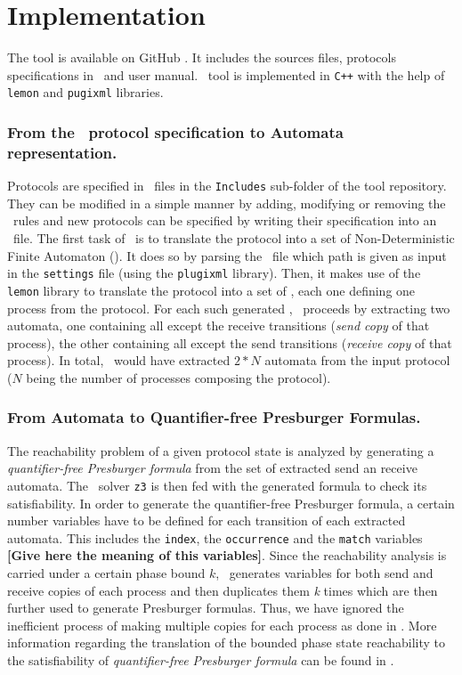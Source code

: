 \section{Implementation}
\label{sec:optim}

The tool is available on GitHub \cite{github.MPass}.
It includes the sources files, protocols specifications in \xml\ and user manual.
%
\MPass\ tool is implemented in \texttt{C++} with the help of \texttt{lemon} and \texttt{pugixml} libraries.
%

\subsubsection*{From the \Xml\ protocol specification to Automata representation.}
\label{subsec:copies}
Protocols are specified in \Xml\ files in the \texttt{Includes} sub-folder of the tool repository.
%
They can be modified in a simple manner by adding, modifying or removing the \Xml\ rules and
new protocols can be specified by writing their specification into an \Xml\ file.
%
The first task of \MPass\ is to translate the protocol into a set of Non-Deterministic Finite Automaton (\Nfa).
%
It does so by parsing the \Xml\ file which path is given as input in the \texttt{settings} file (using the \texttt{plugixml} library).
%
Then, it makes use of the \texttt{lemon} library to translate the protocol into a set of \Nfa,
each one defining one process from the protocol.
%
For each such generated \Nfa, \MPass\ proceeds by extracting two automata,
one containing all except the receive transitions (\textit{send copy} of that process),
the other containing all except the send transitions (\textit{receive copy} of that process).
%
In total, \MPass\ would have extracted $2*N$ automata from the input protocol
($N$ being the number of processes composing the protocol).

\subsubsection*{From Automata to Quantifier-free Presburger Formulas.}
The reachability problem of a given protocol state is analyzed by generating a \emph{quantifier-free Presburger formula}
from the set of extracted send an receive automata.
The \Smt\ solver \texttt{z3} is then fed with the generated formula to check its satisfiability.
%
In order to generate the quantifier-free Presburger formula, a certain number variables have to be 
defined for each transition of each extracted automata.
This includes the \texttt{index}, the \texttt{occurrence} and the \texttt{match} variables {\bf [Give here the meaning of this variables]}.
%
Since the reachability analysis is carried under a certain phase bound $k$,
\MPass\ generates variables for both send and receive copies of each process and then duplicates them \emph{k} times
which are then further used to generate Presburger formulas.
Thus, we have ignored the inefficient process of making multiple copies for each process as done in \cite{AAC13}.
%
More information regarding the translation of the bounded phase state reachability to the satisfiability of \emph{quantifier-free Presburger formula} can be found in \cite{AAC13}.

